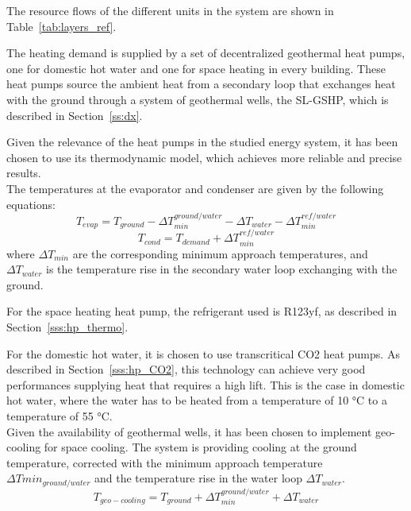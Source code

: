 \documentclass{article}
\begin{document}
The resource flows of the different units in the system are shown in Table~\ref{tab:layers_ref}.




The heating demand is supplied by a set of decentralized geothermal heat pumps, one for domestic hot water and one for space heating in every building. These heat pumps source the ambient heat from a secondary loop that exchanges heat with the ground through a system of geothermal wells, the SL-GSHP, which is described in Section~\ref{ss:dx}. 

Given the relevance of the heat pumps in the studied energy system, it has been chosen to use its thermodynamic model, which achieves more reliable and precise results.\\

The temperatures at the evaporator and condenser are given by the following equations:
\begin{equation}
    T_{evap} = T_{ground} - \Delta T_{min}^{ground/water} - \Delta T_{water} - \Delta T_{min}^{ref/water}
\end{equation}
\begin{equation}
    T_{cond} = T_{demand} + \Delta T_{min}^{ref/water}
\end{equation}
where $\Delta T_{min}$ are the corresponding minimum approach temperatures, and $\Delta T_{water}$ is the temperature rise in the secondary water loop exchanging with the ground.

For the space heating heat pump, the refrigerant used is R123yf, as described in Section~\ref{sss:hp_thermo}.

For the domestic hot water, it is chosen to use transcritical CO2 heat pumps. As described in Section~\ref{sss:hp_CO2}, this technology can achieve very good performances supplying heat that requires a high lift. This is the case in domestic hot water, where the water has to be heated from a temperature of 10 \si{\celsius} to a temperature of 55 \si{\celsius}.\\

Given the availability of geothermal wells, it has been chosen to implement geo-cooling for space cooling. The system is providing cooling at the ground temperature, corrected with the minimum approach temperature $\Delta Tmin_{ground/water}$ and the temperature rise in the water loop $\Delta T_{water}$.
\begin{equation}
T_{geo-cooling} = T_{ground} + \Delta T_{min}^{ground/water} + \Delta T_{water}
\end{equation}
\end{document}
